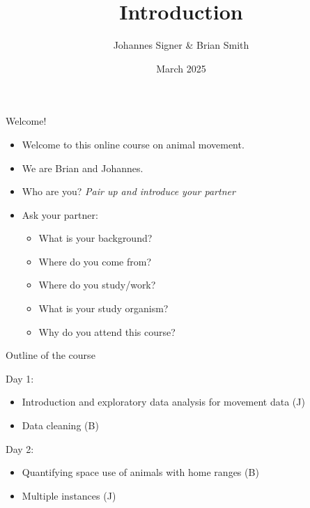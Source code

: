 \documentclass[ignorenonframetext,,t]{beamer}
\title{Introduction}
\author{Johannes Signer \& Brian Smith}
\date{March 2025}
\providecommand{\tightlist}{%
\setlength{\itemsep}{0pt}\setlength{\parskip}{0pt}}
\providecommand{\tightlist}{%
\setlength{\itemsep}{0pt}\setlength{\parskip}{0pt}}
\renewcommand{\tightlist}{\setlength{\itemsep}{1.4ex}\setlength{\parskip}{0pt}}
\begin{document}
\frame{\titlepage}



\begin{frame}{Welcome!}
\label{welcome}
\begin{itemize}
\item
  Welcome to this online course on animal movement.
\item
  We are Brian and Johannes.
\item
  Who are you? \emph{Pair up and introduce your partner}
\item
  Ask your partner:

  \begin{itemize}
  \tightlist
  \item
    What is your background?
  \item
    Where do you come from?
  \item
    Where do you study/work?
  \item
    What is your study organism?
  \item
    Why do you attend this course?
  \end{itemize}
\end{itemize}
\end{frame}

\begin{frame}{Outline of the course}
\label{outline-of-the-course}
\begin{block}{Day 1:}
\label{day-1}
\begin{itemize}
\tightlist
\item
  Introduction and exploratory data analysis for movement data (J)
\item
  Data cleaning (B)
\end{itemize}
\end{block}

\begin{block}{Day 2:}
\label{day-2}
\begin{itemize}
\tightlist
\item
  Quantifying space use of animals with home ranges (B)
\item
  Multiple instances (J)
\end{itemize}
\end{block}
\end{frame}
\end{document}
